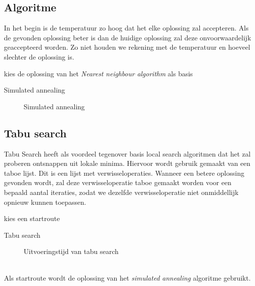 \documentclass[12pt]{article}
\begin{document}
\subsection{Algoritme}
In het begin is de temperatuur zo hoog dat het elke oplossing zal accepteren. 
Als de gevonden oplossing beter is dan de huidige oplossing zal deze onvoorwaardelijk geaccepteerd worden. 
Zo niet houden we rekening met de temperatuur en hoeveel slechter de oplossing is.
\\
\newline
\begin{algorithm}[H]
\SetAlgoLined 
kies de oplossing van het \textit{Nearest neighbour algorithm} als basis \;
 \caption{Simulated annealing}
\end{algorithm}
\begin{figure}[H]
\centering
\subfigure[Tijdscomplexiteit]{
 \scalebox{.6}{}
}
\caption{Simulated annealing}
\label{sa}
\end{figure}
\subsection{Tabu search}
Tabu Search heeft als voordeel tegenover basis local search algoritmen dat het zal proberen ontsnappen uit lokale minima. Hiervoor wordt gebruik gemaakt van een taboe lijst. Dit is een lijst met verwisseloperaties. Wanneer een betere oplossing gevonden wordt, zal deze verwisseloperatie taboe gemaakt worden voor een bepaald aantal iteraties, zodat we dezelfde verwisseloperatie niet onmiddellijk opnieuw kunnen toepassen.
\\
\begin{algorithm}[H]
\SetAlgoLined 
  kies een startroute\;
 \caption{Tabu search}
\end{algorithm}
\begin{figure}[H]
  \begin{center}
    
    \caption{Uitvoeringstijd van tabu search}
    \label{tb}
  \end{center}
\end{figure}
\noindent
\\
Als startroute wordt de oplossing van het \textit{simulated annealing} algoritme gebruikt.
\end{document}
